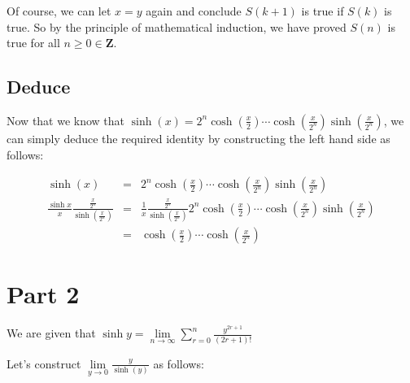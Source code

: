 \documentclass{article}
\begin{document}
Of course, we can let $x=y$ again and conclude $ S(k+1) $ is true if $S(k)$ is true. So by the principle of mathematical induction, we have proved $ S(n) $ is true for all $ n \ge 0 \in \mathbf{Z} $.

\subsection*{Deduce}
Now that we know that $\sinh(x) = 2^n \cosh(\frac{x}{2}) \cdots \cosh(\frac{x}{2^n}) \sinh(\frac{x}{2^n})$, we can simply deduce the required identity by constructing the left hand side as follows:

\begin{eqnarray*}
                                                                   \sinh(x) &=& 2^n \cosh(\frac{x}{2}) \cdots \cosh(\frac{x}{2^n}) \sinh(\frac{x}{2^n}) \\
    \frac{\sinh{x}}{x}\frac{\frac{x}{2^n}}{\sinh\left(\frac{x}{2^n}\right)} &=& \frac{1}{x}\frac{\frac{x}{2^n}}{\sinh\left(\frac{x}{2^n}\right)} 2^n \cosh(\frac{x}{2}) \cdots \cosh(\frac{x}{2^n}) \sinh(\frac{x}{2^n}) \\
                                                                            &=& \cosh(\frac{x}{2}) \cdots \cosh(\frac{x}{2^n})
\end{eqnarray*}

\section*{Part 2}
We are given that $ \sinh{y} = \lim\limits_{n \to \infty} \sum\limits_{r = 0}^n \frac{y^{2r+1}}{(2r+1)!}$

Let's construct $ \lim\limits_{y \to 0} \frac{y}{\sinh(y)} $ as follows:
\end{document}
